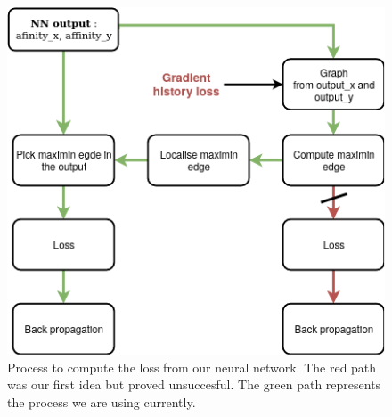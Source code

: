 \begin{figure}[!htbp]
	\centering
	\includegraphics[width=0.6\linewidth]{./images/gradient_history.png}
	\caption{Process to compute the loss from our neural network. The red path
	was our first idea but proved unsuccesful. The green path represents the
process we are using currently.}
	\label{fig:bpt_method}
\end{figure}


